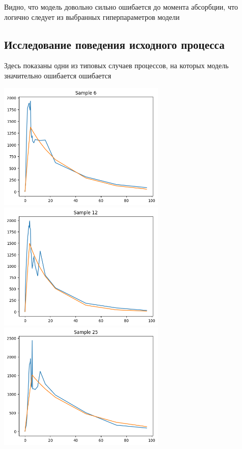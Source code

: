 \documentclass{article}
\begin{document}
Видно, что модель довольно сильно ошибается до момента абсорбции, что логично следует из выбранных гиперпараметров модели

\subsection{Исследование поведения исходного процесса}

Здесь показаны одни из типовых случаев процессов, на которых модель значительно ошибается ошибается

\includegraphics[width=0.6\textwidth]{example4_1.png} \newline
\includegraphics[width=0.6\textwidth]{example5_1.png} \newline
\includegraphics[width=0.6\textwidth]{example6_1.png} \newline
\end{document}
